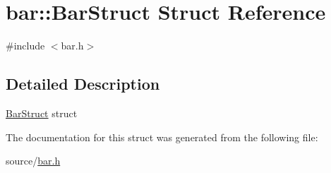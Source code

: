 \hypertarget{structbar_1_1BarStruct}{}\section{bar\+:\+:Bar\+Struct Struct Reference}
\label{structbar_1_1BarStruct}


{\ttfamily \#include $<$bar.\+h$>$}



\subsection{Detailed Description}
\hyperlink{structbar_1_1BarStruct}{Bar\+Struct} struct 

The documentation for this struct was generated from the following file\+:\begin{DoxyCompactItemize}
\item 
source/\hyperlink{bar_8h}{bar.\+h}\end{DoxyCompactItemize}
